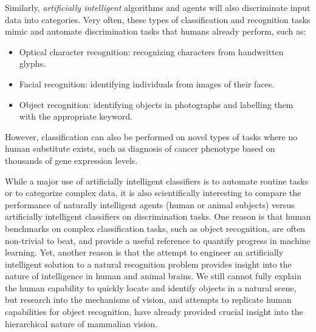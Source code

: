 Similarly, \emph{artificially intelligent} algorithms and agents will
also discriminate input data into categories.  Very often, these types
of classification and recognition tasks mimic and automate
discrimination tasks that humans already perform, such as:
\begin{itemize}
\item Optical character recognition: recognizing characters from handwritten glyphs.
\item Facial recognition: identifying individuals from images of their faces.
\item Object recognition: identifying objects in photographs and labelling them with the appropriate keyword.
\end{itemize}
However, classification can also be performed on novel types of tasks
where no human substitute exists, such as diagnosis of cancer
phenotype based on thousands of gene expression levels.

While a major use of artificially intelligent classifiers is to
automate routine tasks or to categorize complex data, it is also
scientifically interesting to compare the performance of naturally
intelligent agents (human or animal subjects) versus artificially
intelligent classifiers on discrimination tasks.  One reason is that human
benchmarks on complex classification tasks, such as object
recognition, are often non-trivial to beat, and provide a useful
reference to quantify progress in machine learning.  Yet, another
reason is that the attempt to engineer an artificially intelligent
solution to a natural recognition problem provides insight into the
nature of intelligence in human and animal brains.  We still cannot
fully explain the human capability to quickly locate and identify
objects in a natural scene, but research into the mechanisms of
vision, and attempts to replicate human capabilities for object
recognition, have already provided crucial insight into the
hierarchical nature of mammalian vision.  %

